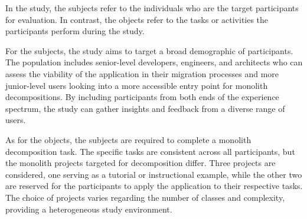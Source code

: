 In the study, the subjects refer to the individuals who are the target
participants for evaluation. In contrast, the objects refer to the tasks or
activities the participants perform during the study.

For the subjects, the study aims to target a broad demographic of participants.
The population includes senior-level developers, engineers, and architects who
can assess the viability of the application in their migration processes and
more junior-level users looking into a more accessible entry point for monolith
decompositions. By including participants from both ends of the experience
spectrum, the study can gather insights and feedback from a diverse range of
users.

As for the objects, the subjects are required to complete a monolith
decomposition task. The specific tasks are consistent across all participants,
but the monolith projects targeted for decomposition differ. Three projects are
considered, one serving as a tutorial or instructional example, while the other
two are reserved for the participants to apply the application to their
respective tasks. The choice of projects varies regarding the number of classes
and complexity, providing a heterogeneous study environment.
